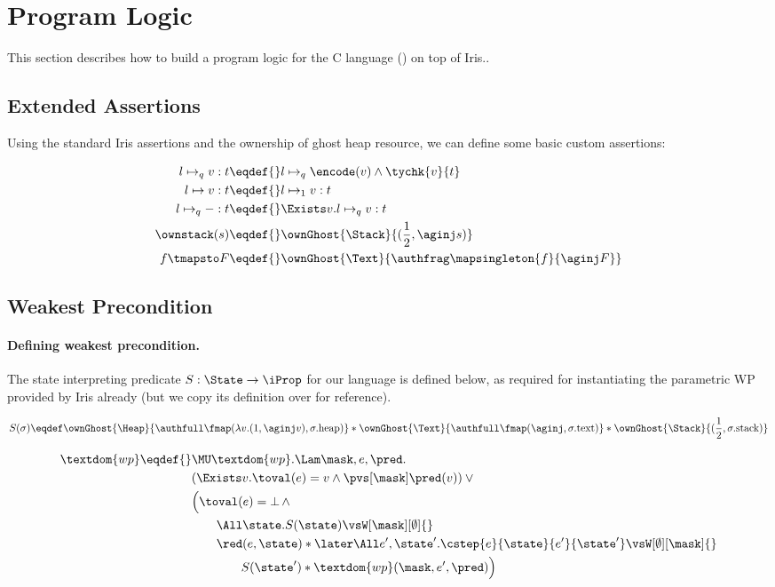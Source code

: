 \section{Program Logic}
\label{sec:program-logic}

This section describes how to build a program logic for the C language (\cf {}) on top of Iris..

\subsection{Extended Assertions}

Using the standard Iris assertions and the ownership of ghost heap resource, we can define some basic custom assertions:

\begin{align*}
l \mapsto_q v : t \eqdef{}&  l \mapsto_q \encode(v) \land \tychk{v}{t} \\
l \mapsto v : t              \eqdef{}& l \mapsto_1 v : t\\
l \mapsto_q - : t            \eqdef{}& \Exists v. l \mapsto_q v : t\\
\ownstack(s) \eqdef{}& \ownGhost{\Stack}{(\frac12, \aginj s)} \\
f \tmapsto F \eqdef{}& \ownGhost{\Text}{\authfrag \mapsingleton{f}{\aginj F}}
\end{align*}

\subsection{Weakest Precondition}

\paragraph{Defining weakest precondition.}

The state interpreting predicate $S : \State \to \iProp$ for our \irisc{} language is defined below, as required for
instantiating the parametric WP provided by Iris already (but we copy its definition over for reference).

\[S(\sigma) \eqdef 
  \ownGhost{\Heap}{\authfull \fmap (\lambda v. (1, \aginj v), \sigma.\text{heap})} *
  \ownGhost{\Text}{\authfull \fmap (\aginj, \sigma.\text{text})} *
  \ownGhost{\Stack}{(\frac12, \sigma.\text{stack})}
\]

\begin{align*}
  \textdom{wp} \eqdef{}& \MU \textdom{wp}. \Lam \mask, e, \pred. \\
        & (\Exists v. \toval(e) = v \land \pvs[\mask] \pred(v)) \lor {}\\
        & \Bigl(\toval(e) = \bot \,\land \\
        &\qquad \All \state. S(\state) \vsW[\mask][\emptyset] {}\\
        &\qquad \red(e, \state) * \later\All e', \state'. \cstep{e}{\state}{e'}{\state'} \vsW[\emptyset][\mask] {}\\
        &\qquad\qquad S(\state') * \textdom{wp}(\mask, e', \pred)\Bigr) \\
\end{align*}

